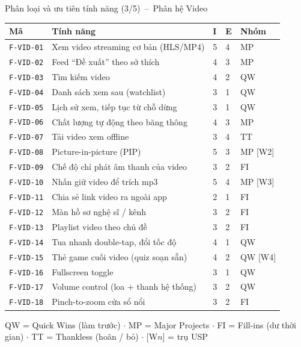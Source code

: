 \documentclass[aspectratio=169]{beamer}
\begin{document}
\begin{frame}{Phân loại và ưu tiên tính năng (3/5)~--~Phân hệ Video}
  \begin{center}\tiny
\begin{tabular}{@{}p{1.6cm}p{7.2cm}p{0.35cm}p{0.35cm}p{1.6cm}@{}}
\toprule
\textbf{Mã} & \textbf{Tính năng} & \textbf{I} & \textbf{E} & \textbf{Nhóm} \\
\midrule
\texttt{F-VID-01} & Xem video streaming cơ bản (HLS/MP4) & 5 & 4 & MP \\
\texttt{F-VID-02} & Feed ``Đề xuất'' theo sở thích & 4 & 3 & MP \\
\texttt{F-VID-03} & Tìm kiếm video & 4 & 2 & QW \\
\texttt{F-VID-04} & Danh sách xem sau (watchlist) & 3 & 1 & QW \\
\texttt{F-VID-05} & Lịch sử xem, tiếp tục từ chỗ dừng & 3 & 1 & QW \\
\texttt{F-VID-06} & Chất lượng tự động theo băng thông & 4 & 3 & MP \\
\texttt{F-VID-07} & Tải video xem offline & 3 & 4 & TT \\
\texttt{F-VID-08} & Picture-in-picture (PIP) & 5 & 3 & MP [W2] \\
\texttt{F-VID-09} & Chế độ chỉ phát âm thanh của video & 3 & 2 & FI \\
\texttt{F-VID-10} & Nhấn giữ video để trích mp3 & 5 & 4 & MP [W3] \\
\texttt{F-VID-11} & Chia sẻ link video ra ngoài app & 2 & 1 & FI \\
\texttt{F-VID-12} & Màn hồ sơ nghệ sĩ / kênh & 3 & 2 & FI \\
\texttt{F-VID-13} & Playlist video theo chủ đề & 3 & 2 & FI \\
\texttt{F-VID-14} & Tua nhanh double-tap, đổi tốc độ & 4 & 1 & QW \\
\texttt{F-VID-15} & Thẻ game cuối video (quiz soạn sẵn) & 4 & 2 & QW [W4] \\
\texttt{F-VID-16} & Fullscreen toggle & 3 & 1 & QW \\
\texttt{F-VID-17} & Volume control (loa + thanh hệ thống) & 3 & 2 & QW \\
\texttt{F-VID-18} & Pinch-to-zoom cửa sổ nổi & 3 & 2 & FI \\
\bottomrule
\end{tabular}
  \end{center}
  \vfill
  {\tiny\color{brandgray} QW = Quick Wins (làm trước) $\cdot$ MP = Major Projects $\cdot$ FI = Fill-ins (dư thời gian) $\cdot$ TT = Thankless (hoãn / bỏ) $\cdot$ [W$n$] = trụ USP}
\end{frame}
\end{document}
